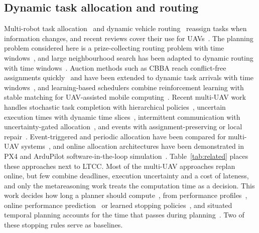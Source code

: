 \documentclass[a4paper,fleqn]{cas-dc}
\newcommand{\mname}{LTCC}  %
\newcounter{prop}
\begin{document}
\subsection{Dynamic task allocation and routing}
Multi-robot task allocation~\cite{gerkey2004formal,chakraa2023mrta} and dynamic vehicle
routing~\cite{psaraftis2016dynamic,soeffker2022review} reassign tasks when information changes, and recent reviews
cover their use for UAVs~\cite{skaltsis2023review,rojasviloria2021drones}. The planning problem considered here is a
prize-collecting routing problem with time windows~\cite{solomon1987algorithms,vansteenwegen2011orienteering}, and large
neighbourhood search has been adapted to dynamic routing with time windows~\cite{alnsdvrp2024}. Auction methods such
as CBBA reach conflict-free assignments quickly~\cite{choi2009consensus} and have been extended to dynamic task
arrivals with time windows~\cite{wang2022phases}, and learning-based schedulers combine reinforcement learning with
stable matching for UAV-assisted mobile computing~\cite{zhao2025throughput}. Recent multi-UAV work handles stochastic task completion with hierarchical
policies~\cite{choudhury2022dynamic}, uncertain execution times with dynamic time slices~\cite{huang2024dynamic},
intermittent communication with uncertainty-gated allocation~\cite{ucdg2026drones}, and events with
assignment-preserving or local repair~\cite{hwang2026apr,shen2026localrepair}. Event-triggered and periodic allocation
have been compared for multi-UAV systems~\cite{cong2026event}, and online allocation architectures have been
demonstrated in PX4 and ArduPilot software-in-the-loop simulation~\cite{calvo2025heterogeneous,ali2026sitl}. Table~\ref{tab:related}
places these approaches next to \mname{}. Most of the multi-UAV approaches replan online, but few combine deadlines,
execution uncertainty and a cost of lateness, and only the metareasoning work treats the computation time as a
decision. This work decides how long a planner should
compute~\cite{zilberstein1996using,herrmann2023metareasoning}, from performance profiles~\cite{boddy1994deliberation},
online performance prediction~\cite{svegliato2018meta} or learned stopping policies~\cite{sung2021quit}, and situated
temporal planning accounts for the time that passes during planning~\cite{cashmore2018clock,shperberg2021situated}. Two
of these stopping rules serve as baselines.
\end{document}
